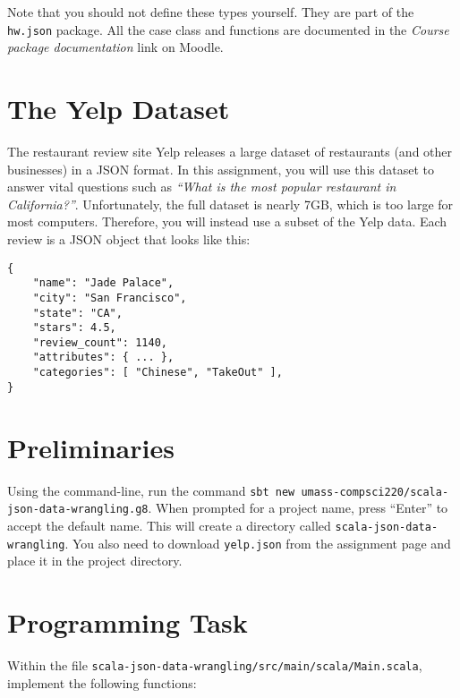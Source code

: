 \documentclass[9pt]{extbook}
\begin{document}
Note that you should not define these types yourself. They are part of the
\lstinline|hw.json| package. All the case class and functions are documented in
the \emph{Course package documentation} link on Moodle.

\section{The Yelp Dataset}

The restaurant review site Yelp releases a large dataset of restaurants
(and other businesses) in a
JSON format. In this assignment, you will use this dataset to answer vital
questions such as \emph{``What is the most popular restaurant in
California?''}. Unfortunately, the full dataset is nearly 7GB, which is too
large for most computers. Therefore, you will instead use a subset of the Yelp
data. Each review is a JSON object that looks like this:
\begin{lstlisting}
{
    "name": "Jade Palace",
    "city": "San Francisco",
    "state": "CA",
    "stars": 4.5,
    "review_count": 1140,
    "attributes": { ... },
    "categories": [ "Chinese", "TakeOut" ],
}
\end{lstlisting}

\section{Preliminaries}

Using the command-line, run the command
\verb|sbt new umass-compsci220/scala-json-data-wrangling.g8|. When prompted for
a project name, press ``Enter'' to accept the default name. This will create
a directory called \verb|scala-json-data-wrangling|.
You also need to download \verb|yelp.json| from the assignment page
and place it in the project directory.


\section{Programming Task}


Within the file \verb|scala-json-data-wrangling/src/main/scala/Main.scala|,
implement the following functions:
\end{document}
